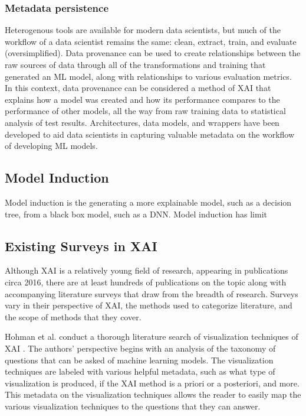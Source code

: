 \documentclass{IEEEtran}
\begin{document}
\subsubsection{Metadata persistence} Heterogenous tools are available for modern data scientists, but much of the workflow of a data scientist remains the same:  clean, extract, train, and evaluate (oversimplified).  Data provenance can be used to create relationships between the raw sources of data through all of the transformations and training that generated an ML model, along with relationships to various evaluation metrics.  In this context, data provenance can be considered a method of XAI that explains how a model was created and how its performance compares to the performance of other models, all the way from raw training data to statistical analysis of test results.  Architectures, data models, and wrappers have been developed to aid data scientists in capturing valuable metadata on the workflow of developing ML models.

\subsection{Model Induction}

Model induction is the generating a more explainable model, such as a decision tree, from a black box model, such as a DNN.  Model induction has limit

\subsection{Existing Surveys in XAI}

Although XAI is a relatively young field of research, appearing in publications circa 2016, there are at least hundreds of publications on the topic along with accompanying literature surveys that draw from the breadth of research.  Surveys vary in their perspective of XAI, the methods used to categorize literature, and the scope of methods that they cover.

Hohman et al. conduct a thorough literature search of visualization techniques of XAI \cite{Hohman2018}.  The authors' perspective begins with an analysis of the taxonomy of questions that can be asked of machine learning models.  The visualization techniques are labeled with various helpful metadata, such as what type of visualization is produced, if the XAI method is a priori or a posteriori, and more.  This metadata on the visualization techniques allows the reader to easily map the various visualization techniques to the questions that they can answer.
\end{document}
